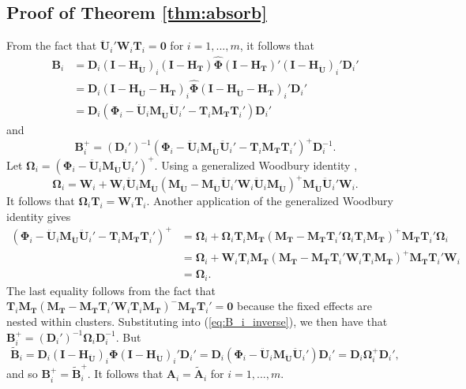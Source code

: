 \documentclass[12pt]{article}\usepackage[]{graphicx}\usepackage[]{color}
\newcommand{\bm}{\mathbf}
\newcommand{\bs}{\boldsymbol}
\begin{document}
\subsection{Proof of Theorem \ref{thm:absorb}}

From the fact that $\bm{\ddot{U}}_i'\bm{W}_i\bm{T}_i = \bm{0}$ for $i = 1,...,m$, it follows that \begin{align*}
\bm{B}_i &= \bm{D}_i \left(\bm{I} - \bm{H_{\ddot{U}}}\right)_i \left(\bm{I} - \bm{H_T}\right) \hat{\bs\Phi} \left(\bm{I} - \bm{H_T}\right)' \left(\bm{I} - \bm{H_{\ddot{U}}}\right)_i' \bm{D}_i'\\
&= \bm{D}_i \left(\bm{I} - \bm{H_{\ddot{U}}} - \bm{H_T}\right)_i \hat{\bs\Phi} \left(\bm{I} - \bm{H_{\ddot{U}}} - \bm{H_T}\right)_i' \bm{D}_i' \\
&= \bm{D}_i \left(\bs\Phi_i - \bm{\ddot{U}}_i \bm{M_{\ddot{U}}}\bm{\ddot{U}}_i' - \bm{T}_i \bm{M_T}\bm{T}_i'\right)\bm{D}_i'
\end{align*}
and 
\begin{equation}
\label{eq:B_i_inverse}
\bm{B}_i^+ = \left(\bm{D}_i'\right)^{-1} \left(\bs\Phi_i - \bm{\ddot{U}}_i \bm{M_{\ddot{U}}}\bm{\ddot{U}}_i' - \bm{T}_i \bm{M_T}\bm{T}_i'\right)^+ \bm{D}_i^{-1}.
\end{equation}
Let $\bs\Omega_i = \left(\bs\Phi_i - \bm{\ddot{U}}_i \bm{M_{\ddot{U}}}\bm{\ddot{U}}_i'\right)^+$.
Using a generalized Woodbury identity \citep{Henderson1981on}, \[
\bs\Omega_i = \bm{W}_i + \bm{W}_i \bm{\ddot{U}}_i \bm{M_{\ddot{U}}}\left(\bm{M_{\ddot{U}}} - \bm{M_{\ddot{U}}} \bm{\ddot{U}}_i' \bm{W}_i \bm{\ddot{U}}_i \bm{M_{\ddot{U}}}\right)^+ \bm{M_{\ddot{U}}}\bm{\ddot{U}}_i'\bm{W}_i. \]
It follows that $\bs\Omega_i \bm{T}_i = \bm{W}_i \bm{T}_i$. 
Another application of the generalized Woodbury identity gives 
\begin{align*}
\left(\bs\Phi_i - \bm{\ddot{U}}_i \bm{M_{\ddot{U}}}\bm{\ddot{U}}_i' - \bm{T}_i \bm{M_T}\bm{T}_i'\right)^+ &= \bs\Omega_i + \bs\Omega_i \bm{T}_i \bm{M_T}\left(\bm{M_T} - \bm{M_T}\bm{T}_i' \bs\Omega_i \bm{T}_i \bm{M_T}\right)^+ \bm{M_T} \bm{T}_i' \bs\Omega_i \\
&= \bs\Omega_i + \bm{W}_i \bm{T}_i \bm{M_T}\left(\bm{M_T} - \bm{M_T}\bm{T}_i' \bm{W}_i \bm{T}_i\bm{M_T}\right)^+ \bm{M_T} \bm{T}_i' \bm{W}_i \\
&= \bs\Omega_i.
\end{align*}
The last equality follows from the fact that $\bm{T}_i \bm{M_T}\left(\bm{M_T} - \bm{M_T}\bm{T}_i' \bm{W}_i \bm{T}_i\bm{M_T}\right)^{-} \bm{M_T} \bm{T}_i' = \bm{0}$ because the fixed effects are nested within clusters. 
Substituting into (\ref{eq:B_i_inverse}), we then have that $\bm{B}_i^+ = \left(\bm{D}_i'\right)^{-1} \bs\Omega_i \bm{D}_i^{-1}$. 
But \[
\bm{\tilde{B}}_i = \bm{D}_i \left(\bm{I} - \bm{H_{\ddot{U}}}\right)_i \bs\Phi \left(\bm{I} - \bm{H_{\ddot{U}}}\right)_i' \bm{D}_i' = \bm{D}_i \left(\bs\Phi_i - \bm{\ddot{U}}_i\bm{M_{\ddot{U}}} \bm{\ddot{U}}_i'\right) \bm{D}_i' = \bm{D}_i \bs\Omega_i^+ \bm{D}_i',
\]
and so $\bm{B}_i^+ = \bm{\tilde{B}}_i^+$. It follows that $\bm{A}_i = \bm{\tilde{A}}_i$ for $i = 1,...,m$. 
\end{document}

